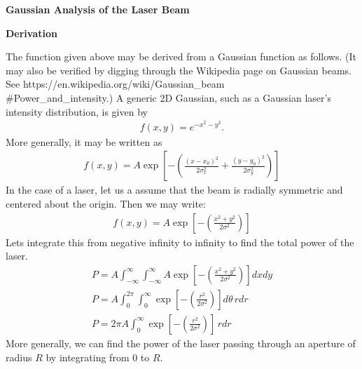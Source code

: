 \newpage
\begin{center}
    \textbf{Gaussian Analysis of the Laser Beam}
\end{center}
\begin{center}
    \textbf{Derivation}
\end{center}
The function given above may be derived from a Gaussian function as follows. (It may also be verified by digging through the Wikipedia page on Gaussian beams. See https://en.wikipedia.org/wiki/Gaussian\_beam\\\#Power\_and\_intensity.) A generic 2D Gaussian, such as a Gaussian laser's intensity distribution, is given by 
\begin{gather}
    f(x,y) = e^{-x^2 - y^2}.
\end{gather}
More generally, it may be written as 
\begin{gather}
    f(x,y) = A \exp \left[-\left(\frac{(x-x_0)^2}{2\sigma_x^2} + \frac{(y-y_0)^2}{2\sigma^2_y} \right)\right]
\end{gather}
In the case of a laser, let us a assume that the beam is radially symmetric and centered about the origin. Then we may write:
\begin{gather}
    f(x,y) = A \exp \left[-\left(\frac{x^2+y^2}{2\sigma^2}\right)\right]
\end{gather}
Lets integrate this from negative infinity to infinity to find the total power of the laser.
\begin{gather}
    P= A \int^\infty_{-\infty} \int^\infty_{-\infty} A \exp \left[-\left(\frac{x^2+y^2}{2\sigma^2}\right)\right] dx dy\\
    P = A \int^{2\pi}_{0} \int^{\infty}_{0} \exp \left[-\left(\frac{r^2}{2\sigma^2}\right)\right] d\theta \, r dr\\
    P = 2\pi A \int^{\infty}_{0} \exp \left[-\left(\frac{r^2}{2\sigma^2}\right)\right] \, r dr
\end{gather}
More generally, we can find the power of the laser passing through an aperture of radius $R$ by integrating from 0 to $R$.
